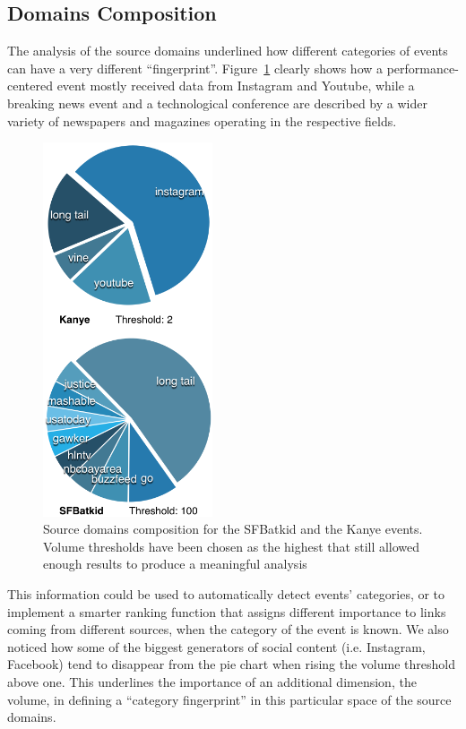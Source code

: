 \documentclass{sig-alternate}
\begin{document}
\subsection{Domains Composition}
\label{sec:domains_composition}
The analysis of the source domains underlined how different categories of events can have a very different ``fingerprint''. Figure~\ref{fig:category_domains} clearly shows how a performance-centered event mostly received data from Instagram and Youtube, while a breaking news event and a technological conference are described by a wider variety of newspapers and magazines operating in the respective fields.
\begin{figure}[htbp]
  \centering
  \includegraphics[width=5cm]{Figures/category_domains.png}
  \caption{Source domains composition for the SFBatkid and the Kanye events. Volume thresholds have been chosen as the highest that still allowed enough results to produce a meaningful analysis}
  \label{fig:category_domains}
\end{figure}
This information could be used to automatically detect events' categories, or to implement a smarter ranking function that assigns different importance to links coming from different sources, when the category of the event is known. We also noticed how some of the biggest generators of social content (i.e. Instagram, Facebook) tend to disappear from the pie chart when rising the volume threshold above one. This underlines the importance of an additional dimension, the volume, in defining a ``category fingerprint'' in this particular space of the source domains.
\end{document}
